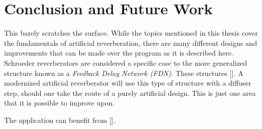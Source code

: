 \chapter{Conclusion and Future Work}
\hspace*{-0.15cm}This barely scratches the surface. While the topics mentioned in this thesis cover the fundamentals of artificial reverberation, there are many different designs and improvements that can be made over the program as it is described here. Schroeder reverberators are considered a specific case to the more generalized structure known as a \textit{Feedback Delay Network (FDN)}. These structures []. A modernized artificial reverberator will use this type of structure with a diffuser step, should one take the route of a purely artificial design. This is just one area that it is possible to improve upon.

The application can benefit from [].
